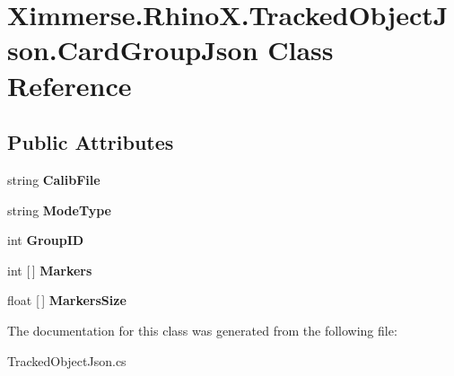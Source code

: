 \hypertarget{class_ximmerse_1_1_rhino_x_1_1_tracked_object_json_1_1_card_group_json}{}\section{Ximmerse.\+Rhino\+X.\+Tracked\+Object\+Json.\+Card\+Group\+Json Class Reference}
\label{class_ximmerse_1_1_rhino_x_1_1_tracked_object_json_1_1_card_group_json}
\subsection*{Public Attributes}
\begin{DoxyCompactItemize}
\item 
\mbox{\label{class_ximmerse_1_1_rhino_x_1_1_tracked_object_json_1_1_card_group_json_a5f31de6baa714b3f23c858ddf627afe1}} 
string {\bfseries Calib\+File}
\item 
\mbox{\label{class_ximmerse_1_1_rhino_x_1_1_tracked_object_json_1_1_card_group_json_ab6f414b2d3dec5cbb3cd9d6074bb9499}} 
string {\bfseries Mode\+Type}
\item 
\mbox{\label{class_ximmerse_1_1_rhino_x_1_1_tracked_object_json_1_1_card_group_json_a6e53696fe2fb2794768f581234e3246c}} 
int {\bfseries Group\+ID}
\item 
\mbox{\label{class_ximmerse_1_1_rhino_x_1_1_tracked_object_json_1_1_card_group_json_aab995bd10c5775dacb54eadb0a1601e7}} 
int \mbox{[}$\,$\mbox{]} {\bfseries Markers}
\item 
\mbox{\label{class_ximmerse_1_1_rhino_x_1_1_tracked_object_json_1_1_card_group_json_a917db29e1342780c1993a18d4184f143}} 
float \mbox{[}$\,$\mbox{]} {\bfseries Markers\+Size}
\end{DoxyCompactItemize}


The documentation for this class was generated from the following file\+:\begin{DoxyCompactItemize}
\item 
Tracked\+Object\+Json.\+cs\end{DoxyCompactItemize}
